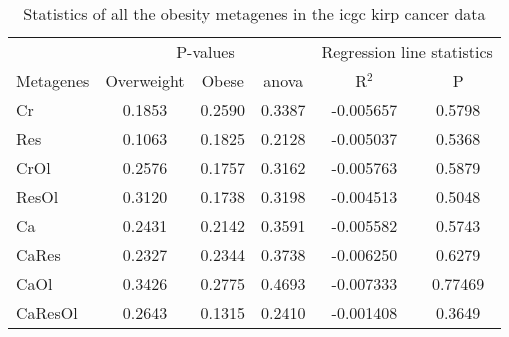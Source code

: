 \begin{appendices}
\begin{table}[htpb]
	\centering
	\caption[Statistics of all the obesity metagenes in the \gls{icgc} \acrshort{kirp} cancer data]{Statistics of all the obesity metagenes in the \gls{icgc} \gls{kirp} cancer data}
	\label{tab:degmetakirp}
	\begin{threeparttable}
		\begin{tabular}{lccccc}
			& \multicolumn{3}{c}{ P-values} & \multicolumn{2}{c}{ Regression line statistics}\\
			\cmidrule(r){2-4} \cmidrule(r){5-6}
			Metagenes &  Overweight &  Obese &  \gls{anova} &  R$^2$ &  P \\
			\hline
			\hline
			\rule{0pt}{2.25ex}Cr      & 0.1853                      & 0.2590  & 0.3387             & -0.005657  & 0.5798              \\
			Res     & 0.1063                      & 0.1825  & 0.2128             & -0.005037  & 0.5368              \\
			CrOl    & 0.2576                      & 0.1757  & 0.3162             & -0.005763  & 0.5879              \\
			ResOl   & 0.3120                      & 0.1738  & 0.3198             & -0.004513  & 0.5048              \\
			Ca      & 0.2431                      & 0.2142  & 0.3591             & -0.005582  & 0.5743              \\
			CaRes   & 0.2327                      & 0.2344  & 0.3738             & -0.006250  & 0.6279              \\
			CaOl    & 0.3426                      & 0.2775  & 0.4693             & -0.007333  & 0.77469             \\
			CaResOl & 0.2643                      & 0.1315  & 0.2410             & -0.001408  & 0.3649              \\
			\hline
			\hline
		\end{tabular}
	\end{threeparttable}
\end{table}


\end{appendices}
